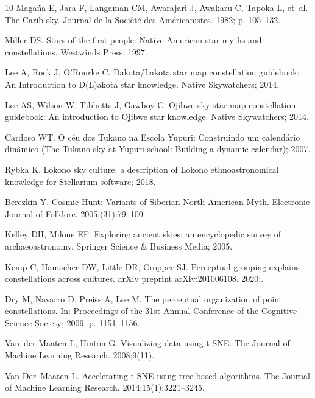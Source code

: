 \documentclass[10pt]{article}
\begin{document}
{\begin{thebibliography}{10}
Maga{\~n}a E, Jara F, Langaman CM, Awarajari J, Awakaru C, Tapoka L, et~al.
\newblock The {C}arib sky.
\newblock Journal de la Soci{\'e}t{\'e} des Am{\'e}ricanistes. 1982; p.
  105--132.

Miller DS.
\newblock Stars of the first people: {N}ative {A}merican star myths and
  constellations.
\newblock Westwinds Press; 1997.

Lee A, Rock J, O’Rourke C.
\newblock Dakota/{L}akota star map constellation guidebook: {A}n Introduction
  to {D(L)}akota star knowledge.
\newblock Native Skywatchers; 2014.

Lee AS, Wilson W, Tibbetts J, Gawboy C.
\newblock Ojibwe sky star map constellation guidebook: {A}n introduction to
  {O}jibwe star knowledge.
\newblock Native Skywatchers; 2014.

Cardoso WT.
\newblock O c{\'e}u dos {T}ukano na Escola {Y}upuri: {C}onstruindo um
  calend{\'a}rio din{\^a}mico ({T}he {T}ukano sky at {Y}upuri school:
  {B}uilding a dynamic calendar); 2007.

Rybka K. Lokono sky culture: a description of {L}okono ethnoastronomical
  knowledge for {S}tellarium software; 2018.

Berezkin Y.
\newblock Cosmic Hunt: Variants of {Siberian}-{North American} Myth.
\newblock Electronic Journal of Folklore. 2005;(31):79--100.

Kelley DH, Milone EF.
\newblock Exploring ancient skies: an encyclopedic survey of archaeoastronomy.
\newblock Springer Science \& Business Media; 2005.

Kemp C, Hamacher DW, Little DR, Cropper SJ.
\newblock Perceptual grouping explains constellations across cultures.
\newblock arXiv preprint arXiv:201006108. 2020;.

Dry M, Navarro D, Preiss A, Lee M.
\newblock The perceptual organization of point constellations.
\newblock In: Proceedings of the 31st Annual Conference of the Cognitive
  Science Society; 2009. p. 1151--1156.

Van~der Maaten L, Hinton G.
\newblock Visualizing data using t-{SNE}.
\newblock The Journal of Machine Learning Research. 2008;9(11).

Van Der~Maaten L.
\newblock Accelerating t-{SNE} using tree-based algorithms.
\newblock The Journal of Machine Learning Research. 2014;15(1):3221--3245.


\end{thebibliography}}
\end{document}
